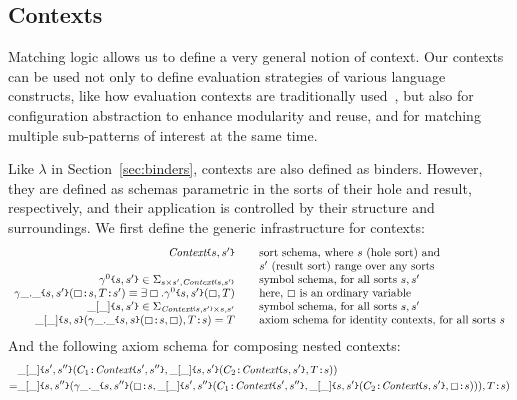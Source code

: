 \documentclass[UTF8,11pt]{article}
\theoremstyle{plain}
\theoremstyle{definition}
\theoremstyle{remark}
\newcommand{\cln}{\texttt{:}}
\newcommand{\Context}{\textit{Context}}
\newcommand{\hole}{\boxempty}
\newcommand{\parametric}[2]{{#1}\raisebox{.2ex}{\texttt{\footnotesize{\{}}}#2\raisebox{.2ex}{\texttt{\footnotesize{\}}}}}
\newcommand{\parametricscript}[2]{{#1}\raisebox{.2ex}{\texttt{\tiny{\{}}}#2\raisebox{.2ex}{\texttt{\tiny{\}}}}}
\begin{document}
\subsection{Contexts}

Matching logic allows us to define a very general notion of context.
Our contexts can be used not only to define evaluation strategies of
various language constructs, like how evaluation contexts are
traditionally used~\cite{felleisen-hieb-92}, but also for configuration
abstraction to enhance modularity and reuse, and for matching multiple
sub-patterns of interest at the same time.

Like $\lambda$ in Section~\ref{sec:binders}, contexts are also defined
as binders.
However, they are defined as schemas parametric in the sorts of their
hole and result, respectively, and their application is controlled by
their structure and surroundings.
We first define the generic infrastructure for contexts:
$$
\begin{array}{r@{\hspace*{5ex}}l}
\parametric{\Context}{s,s'} &
\textrm{sort schema, where $s$ (hole sort) and}
\\ &\textrm{$s'$ (result sort) range over any sorts}
\\ \parametric{\gamma^0}{s,s'} \in \Sigma_{s \times s', 
\parametricscript{\Context}{s,s'}}
& \textrm{symbol schema, for all sorts $s, s'$}
\\ \parametric{\gamma\_.\_}{s,s'}(\hole\cln s,T\cln s') \equiv \exists \hole . 
\parametric{\gamma^0}{s,s'}(\hole,T)
& \textrm{here, $\hole$ is an ordinary variable}
\\
\parametric{\_[\_]}{s,s'} \in \Sigma_{\parametricscript{\Context}{s,s'} \times s, s'}
& \textrm{symbol schema, for all sorts $s, s'$}
\\
\parametric{\_[\_]}{s,s}(\parametric{\gamma\_.\_}{s,s}(\hole\cln s, \hole),T\cln s) = T
& \textrm{axiom schema for identity contexts, for all sorts $s$}
\end{array}
$$
And the following axiom schema for composing nested contexts:
\begin{align*}
&\parametric{\_[\_]}{s',s''}(C_1 \cln \parametric{\Context}{s',s''},
\parametric{\_[\_]}{s,s'}(C_2 \cln \parametric{\Context}{s,s'},
T\cln s))
\\
= &
\parametric{\_[\_]}{s,s''}(
\parametric{\gamma\_.\_}{s,s''}(\hole\cln s,
\parametric{\_[\_]}{s',s''}(
C_1 \cln \parametric{\Context}{s',s''},
\parametric{\_[\_]}{s,s'}(C_2 \cln \parametric{\Context}{s,s'},
\hole\cln s))
), T\cln s)
\end{align*}
\end{document}
